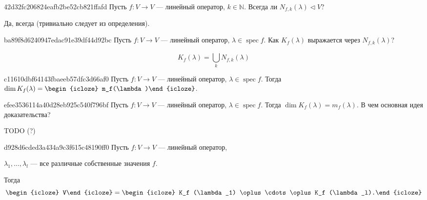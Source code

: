 \begin{note}{42d32fc206824eafb2be52cb821ffafd}
    Пусть \( f : V \to V \) --- линейный оператор, \( k \in \mathbb N \).
    Всегда ли \( N_{f,k}(\lambda) \triangleleft V \)?

    \begin{cloze}{1}
        Да, всегда (тривиально следует из определения).
    \end{cloze}
\end{note}

\begin{note}{ba89f8d6240947edac91e39df44d92bc}
    Пусть \( f : V \to V \) --- линейный оператор, \( \lambda \in \operatorname{spec} f \).
    Как \( K_f(\lambda) \) выражается через \( N_{f,k} (\lambda) \)?

    \begin{cloze}{1}
        \[
            K_f(\lambda) = \bigcup_{k}^{} N_{f,k}(\lambda)
        \]
    \end{cloze}
\end{note}

\begin{note}{c11610dbf64143fbaeeb57dfc3d66af0}
    Пусть \( f : V \to V \) --- линейный оператор, \( \lambda \in \operatorname{spec} f \).
    Тогда \( \dim K_f(\lambda) = \begin{icloze}{1}m_f(\lambda)\end{icloze} \).
\end{note}

\begin{note}{efee3536114a40d28eb925c540f796bf}
    Пусть \( f : V \to V \) --- линейный оператор, \( \lambda \in \operatorname{spec} f \).
    Тогда \( \dim K_f(\lambda) = m_f(\lambda) \).
    В чем основная идея доказательства?

    TODO (?)
\end{note}

\begin{note}{d928d6cded3a434a9c3f615c48190ff0}
    Пусть \( f : V \to V \) --- линейный оператор, \begin{icloze}{3}\( \lambda_1, \ldots, \lambda_l \) --- все различные собственные значения \( f \).\end{icloze}
    Тогда
    \[
        \begin{icloze}{2}V\end{icloze} = \begin{icloze}{1}K_f (\lambda_1) \oplus \cdots \oplus K_f (\lambda_l).\end{icloze}
    \]
\end{note}

